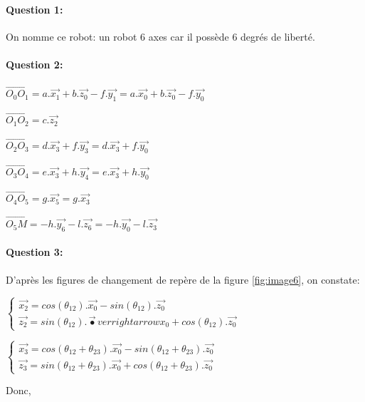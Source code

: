 \paragraph{Question 1:} On nomme ce robot: \og un robot 6 axes \fg car il possède 6 degrés de liberté.

\paragraph{Question 2:}

$\overrightarrow{O_0O_1}=a.\overrightarrow{x_1}+b.\overrightarrow{z_0}-f.\overrightarrow{y_1}=a.\overrightarrow{x_0}+b.\overrightarrow{z_0}-f.\overrightarrow{y_0}$

$\overrightarrow{O_1O_2}=c.\overrightarrow{z_2}$

$\overrightarrow{O_2O_3}=d.\overrightarrow{x_3}+f.\overrightarrow{y_3}=d.\overrightarrow{x_3}+f.\overrightarrow{y_0}$

$\overrightarrow{O_3O_4}=e.\overrightarrow{x_3}+h.\overrightarrow{y_4}=e.\overrightarrow{x_3}+h.\overrightarrow{y_0}$

$\overrightarrow{O_4O_5}=g.\overrightarrow{x_5}=g.\overrightarrow{x_3}$

$\overrightarrow{O_5M}=-h.\overrightarrow{y_6}-l.\overrightarrow{z_6}=-h.\overrightarrow{y_0}-l.\overrightarrow{z_3}$

\paragraph{Question 3:} D'après les figures de changement de repère de la figure \ref{fig:image6}, on constate:

$\left\{\begin{array}{l} \overrightarrow{x_2}=cos(\theta_{12}).\overrightarrow{x_0}-sin(\theta_{12}).\overrightarrow{z_0} \\
\overrightarrow{z_2}=sin(\theta_{12}).\overrightarrow{•}verrightarrow{x_0}+cos(\theta_{12}).\overrightarrow{z_0} \end{array}\right.$

$\left\{\begin{array}{l} \overrightarrow{x_3}=cos(\theta_{12}+\theta_{23}).\overrightarrow{x_0}-sin(\theta_{12}+\theta_{23}).\overrightarrow{z_0} \\
\overrightarrow{z_3}=sin(\theta_{12}+\theta_{23}).\overrightarrow{x_0}+cos(\theta_{12}+\theta_{23}).\overrightarrow{z_0} \end{array}\right.$

Donc,

